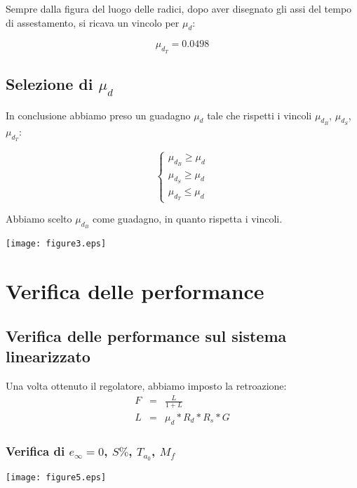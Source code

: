 \documentclass{article}
\begin{document}
Sempre dalla figura del luogo delle radici, dopo aver disegnato gli assi del tempo di assestamento, si ricava un vincolo per $\mu_d$:

$$
    \mu_{d_T} = 0.0498
$$

\subsection{Selezione di $\mu_d$}

In conclusione abbiamo preso un guadagno $\mu_d$ tale che rispetti i vincoli $\mu_{d_B}$, $\mu_{d_S}$, $\mu_{d_T}$:

$$
\begin{cases}
    \mu_{d_B}\geq\mu_d\\
    \mu_{d_S}\geq\mu_d\\
    \mu_{d_T}\leq\mu_d
\end{cases}
$$

Abbiamo scelto $\mu_{d_B}$ come guadagno, in quanto rispetta i vincoli.


\begin{center}
    \texttt{[image: figure3.eps]}
\end{center}

\newpage

\section{Verifica delle performance}

\subsection{Verifica delle performance sul sistema linearizzato}

Una volta ottenuto il regolatore, abbiamo imposto la retroazione:
$$
    \begin{array}{lcl}
        F & = & \frac{L}{1+L} \\
        L & = & \mu_d * R_d * R_s * G
    \end{array}
$$

\subsubsection{Verifica di $e_\infty=0$, $S\%$, $T_{a_0}$, $M_f$}

\begin{center}
    \texttt{[image: figure5.eps]}
\end{center}
\end{document}
